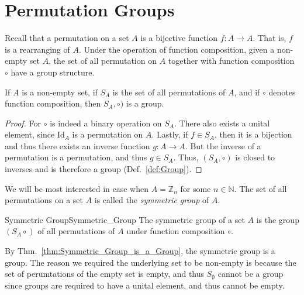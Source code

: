 \section{Permutation Groups}
    Recall that a permutation on a set $A$ is a bijective function 
    $f:A\rightarrow{A}$. That is, $f$ is a rearranging of $A$. Under the
    operation of function composition, given a non-empty set $A$, the set of all
    permutation on $A$ together with function composition $\circ$ have a
    group structure.
    \begin{theorem}
        \label{thm:Symmetric_Group_is_a_Group}%
        If $A$ is a non-empty set, if $S_{A}$ is the set of all permutations of
        $A$, and if $\circ$ denotes function composition, then
        $S_{A},\circ)$ is a group.
    \end{theorem}
    \begin{proof}
        For $\circ$ is indeed a binary operation on $S_{A}$. There also
        exists a unital element, since $\textrm{Id}_{A}$ is a permutation on
        $A$. Lastly, if $f\in{S}_{A}$, then it is a bijection and thus there
        exists an inverse function $g:A\rightarrow{A}$. But the inverse of a
        permutation is a permutation, and thus $g\in{S}_{A}$. Thus,
        $(S_{A},\circ)$ is closed to inverses and is therefore a group
        (Def.~\ref{def:Group}).
    \end{proof}
    We will be most interested in case when $A=\mathbb{Z}_{n}$ for some
    $n\in\mathbb{N}$. The set of all permutations on a set $A$ is called the
    \textit{symmetric group} of $A$.
    \begin{fdefinition}{Symmetric Group}{Symmetric_Group}
        The symmetric group of a set $A$ is the group $(S_{A}\circ)$
        of all permutations of $A$ under function composition $\circ$.
    \end{fdefinition}
    By Thm.~\ref{thm:Symmetric_Group_is_a_Group}, the symmetric group is a
    group. The reason we required the underlying set to be non-empty is because
    the set of perumtations of the empty set is empty, and thus $S_{\emptyset}$
    cannot be a group since groups are required to have a unital element, and
    thus cannot be empty.
